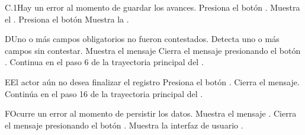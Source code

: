 
\begin{UCtrayectoriaA}{C.1}{Hay un error al momento de guardar los avances.}
\UCpaso[\UCactor] Presiona el botón .
\UCpaso Muestra el .
\UCpaso[\UCactor] Presiona el botón  
\UCpaso Muestra la .
\end{UCtrayectoriaA}


\begin{UCtrayectoriaA}{D}{Uno o más campos obligatorios no fueron contestados.}
	\UCpaso Detecta uno o más campos sin contestar.
    \UCpaso Muestra el mensaje 
    \UCpaso[\UCactor] Cierra el mensaje presionando el botón .
    \UCpaso Continua en el paso 6 de la trayectoria principal del .
\end{UCtrayectoriaA}


\begin{UCtrayectoriaA}{E}{El actor aún no desea finalizar el registro}
	\UCpaso[\UCactor] Presiona el botón .
	\UCpaso Cierra el mensaje.
	\UCpaso Continúa en el paso 16 de la trayectoria principal del .
\end{UCtrayectoriaA}


\begin{UCtrayectoriaA}{F}{Ocurre un error al momento de persistir los datos.}
	\UCpaso Muestra el mensaje .
	\UCpaso[\UCactor] Cierra el mensaje presionando el botón .
	\UCpaso Muestra la interfaz de usuario .
\end{UCtrayectoriaA}

